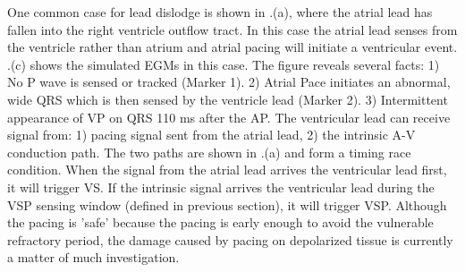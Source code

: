 One common case for lead dislodge is shown in .(a), where the atrial lead has fallen into the right ventricle outflow tract. 
In this case the atrial lead senses from the ventricle rather than atrium and atrial pacing will initiate a ventricular event.
 .(c) shows the simulated EGMs in this case. 
The figure reveals several facts: 1) No P wave is sensed or tracked (Marker 1). 2) Atrial Pace initiates an abnormal, wide QRS which is then sensed by the ventricle lead (Marker 2). 3) Intermittent appearance of VP on QRS 110 ms after the AP. 
The ventricular lead can receive signal from: 1) pacing signal sent from the atrial lead, 2) the intrinsic A-V conduction path. The two paths are shown in .(a) and form a timing race condition. When the signal from the atrial lead arrives the ventricular lead first, it will trigger VS. If the intrinsic signal arrives the ventricular lead during the VSP sensing window (defined in previous section), it will trigger VSP. Although the pacing is 'safe' because the pacing is early enough to avoid the vulnerable refractory period, the damage caused by pacing on depolarized tissue is currently a matter of much investigation.\\



